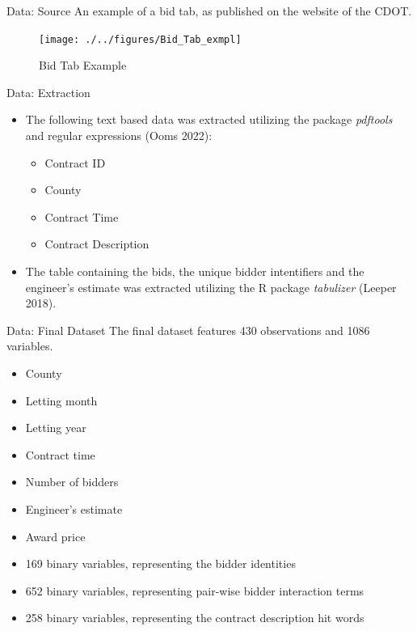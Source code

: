 \documentclass[
  11pt,
  ignorenonframetext,
]{beamer}
\providecommand{\tightlist}{%
  \setlength{\itemsep}{0pt}\setlength{\parskip}{0pt}}
\begin{document}
\begin{frame}{Data: Source}
\protect\hypertarget{data-source}{}
An example of a bid tab, as published on the website of the CDOT.

\begin{figure}

{\centering \texttt{[image: ./../figures/Bid\_Tab\_exmpl]} 

}

\caption{Bid Tab Example}\label{fig:unnamed-chunk-2}
\end{figure}
\end{frame}

\begin{frame}{Data: Extraction}
\protect\hypertarget{data-extraction}{}
\begin{itemize}
\tightlist
\item
  The following text based data was extracted utilizing the package
  \emph{pdftools} and regular expressions (Ooms 2022):

  \begin{itemize}
  \tightlist
  \item
    Contract ID
  \item
    County
  \item
    Contract Time
  \item
    Contract Description
  \end{itemize}
\item
  The table containing the bids, the unique bidder intentifiers and the
  engineer's estimate was extracted utilizing the R package
  \emph{tabulizer} (Leeper 2018).
\end{itemize}
\end{frame}

\begin{frame}{Data: Final Dataset}
\protect\hypertarget{data-final-dataset}{}
The final dataset features 430 observations and 1086 variables.

\begin{itemize}
\tightlist
\item
  County
\item
  Letting month
\item
  Letting year
\item
  Contract time
\item
  Number of bidders
\item
  Engineer's estimate
\item
  Award price
\item
  169 binary variables, representing the bidder identities
\item
  652 binary variables, representing pair-wise bidder interaction terms
\item
  258 binary variables, representing the contract description hit words
\end{itemize}
\end{frame}
\end{document}
